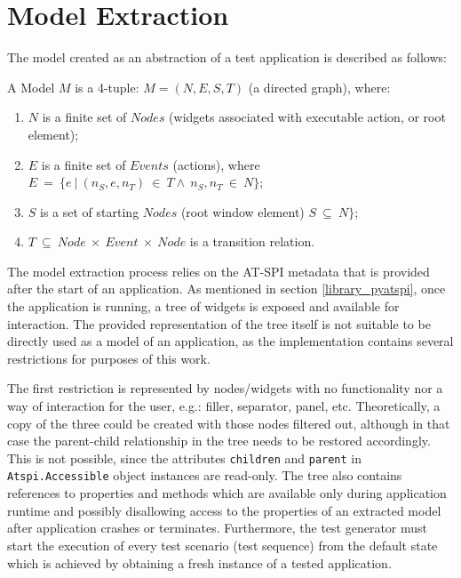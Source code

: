 \section{Model Extraction}
The model created as an abstraction of a test application is described as follows: 

\theoremstyle{definition}
\begin{definition}
A Model $M$ is a 4-tuple: $M = (N, E, S, T)$ (a directed graph), where:
\begin{enumerate}
\item $N$ is a finite set of $Nodes$ (widgets associated with executable action, or root element);
\item $E$ is a finite set of $Events$ (actions), where  $E\ =\ \{e\ |\ (n_S, e, n_T)\ \in\ T \land\ n_S,n_T\ \in \ N\}$;
\item $S$ is a set of starting $Nodes$ (root window element)  $S\ \subseteq\ N\}$;
\item $T\ \subseteq\ Node\ \times \ Event\ \times \ Node$ is a transition relation.
\end{enumerate}
\end{definition}

The model extraction process relies on the AT-SPI metadata that is provided after the start of an application. As mentioned in section \ref{library_pyatspi}, once the application is running, a tree of widgets is exposed and available for interaction. The provided representation of the tree itself is not suitable to be directly used as a model of an application, as the implementation contains several restrictions for purposes of this work.

The first restriction is represented by nodes/widgets with no functionality nor a way of interaction for the user, e.g.: filler, separator, panel, etc. Theoretically, a copy of the three could be created with those nodes filtered out, although in that case the parent-child relationship in the tree needs to be restored accordingly. This is not possible, since the attributes \texttt{children} and \texttt{parent} in \texttt{Atspi.Accessible} object instances are read-only. The tree also contains references to properties and methods which are available only during application runtime and possibly disallowing access to the properties of an extracted model after application crashes or terminates. Furthermore, the test generator must start the execution of every test scenario (test sequence) from the default state which is achieved by obtaining a fresh instance of a tested application.

